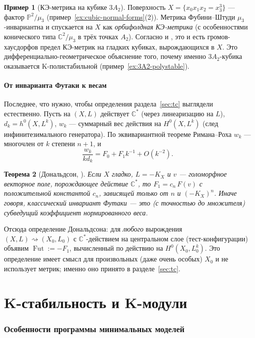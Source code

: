 \documentclass[11pt,a4paper]{article}
\theoremstyle{plain}
\newtheorem{theorem}{Теорема}[section]
\theoremstyle{definition}
\newtheorem{example}[theorem]{Пример}
\theoremstyle{remark}
\renewcommand{\C}{\mathbb{C}}
\newcommand{\PP}{\mathbb{P}}
\DeclareMathOperator{\Fut}{Fut}
\begin{document}
\begin{example}[КЭ-метрика на кубике $3A_2$]
Поверхность $X=\{x_0x_1x_2=x_3^3\}$ --- фактор $\PP^2/\mu_3$ (пример~\ref{ex:cubic-normal-forms}(2)).
Метрика Фубини--Штуди $\mu_3$-инвариантна и спускается на $X$ как \emph{орбифолдная КЭ-метрика}
(с особенностями конического типа $\C^2/\mu_3$ в трёх точках $A_2$). Согласно \cite{OSS} и
\cite{DS14}, это и есть громов-хаусдорфов предел КЭ-метрик на гладких кубиках, вырождающихся в $X$.
Это дифференциально-геометрическое объяснение того, почему именно $3A_2$-кубика оказывается
K-полистабильной (пример~\ref{ex:3A2-polystable}).
\end{example}

\subsection{От инварианта Футаки к весам}

Последнее, что нужно, чтобы определения раздела~\ref{sec:tc} выглядели естественно. Пусть на
$(X,L)$ действует $\C^*$ (через линеаризацию на $L$), $d_k=h^0(X,L^k)$, $w_k$ --- суммарный вес
действия на $H^0(X,L^k)$ (след инфинитезимального генератора). По эквивариантной теореме
Римана--Роха $w_k$ --- многочлен от $k$ степени $n+1$, и
\[
\frac{w_k}{kd_k}=F_0+F_1k^{-1}+O(k^{-2}).
\]

\begin{theorem}[{Дональдсон, \cite[2.2]{Don02}}]\label{thm:Donaldson-Futaki}
Если $X$ гладко, $L=-K_X$ и $v$ --- голоморфное векторное поле, порождающее действие $\C^*$, то
$F_1=c_n\,F(v)$ с положительной константой $c_n$, зависящей только от $n$ и $(-K_X)^n$. Иначе
говоря, классический инвариант Футаки --- это (с точностью до множителя) субведущий коэффициент
нормированного веса.
\end{theorem}

Отсюда определение Дональдсона: для \emph{любого} вырождения $(X,L)\rightsquigarrow(X_0,L_0)$ с
$\C^*$-действием на центральном слое (тест-конфигурации) объявим $\Fut:=-F_1$, вычисленный по
действию на $H^0(X_0,L_0^k)$. Это определение имеет смысл для произвольных (даже очень особых)
$X_0$ и не использует метрик; именно оно принято в разделе~\ref{sec:tc}.

\part{K-стабильность и K-модули}

\section{Особенности программы минимальных моделей}\label{sec:mmp}
\end{document}
